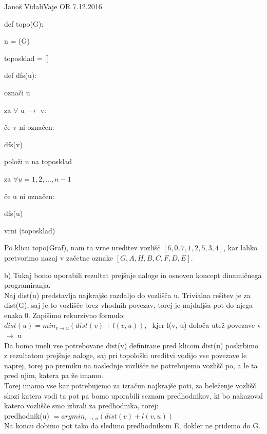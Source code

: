 \begin{naloga}{Janoš Vidali}{Vaje OR 7.12.2016}
\begin{odgovor}
\begin{algorithmic}
\item def topo(G):
\item\quad n = \length(G)
\item\quad toposklad = []  \\
\item\quad def dfs(u): 
\item\qquad označi u
\item\qquad za $\forall$ u $\rightarrow$ v:
\item\qquad\quad če v ni označen: 
\item\qquad\qquad dfs(v) 
\item\qquad\quad položi u na toposklad \\
\item\quad za $\forall u = 1, 2, \dots, n - 1$
\item\qquad če u ni označen:
\item\qquad\quad dfs(u) 
\item\quad vrni \reverse(toposklad) \\
\end{algorithmic}

\noindent Po klicu topo(Graf), nam ta vrne ureditev vozlišč $[6, 0, 7, 1, 2, 5, 3, 4]$, 
kar lahko pretvorimo nazaj v začetne oznake $[G, A, H, B, C, F, D, E]$. \pagebreak

\noindent b) Tukaj bomo uporabili rezultat prejšnje naloge in osnoven 
koncept dinamičnega programiranja.\\

\noindent Naj dist(u) predstavlja najkrajšo razdaljo do vozlišča u.
Trivialna rešitev je za dist(G), saj je to vozlišče brez vhodnih povezav, torej je najdaljša pot do njega
enaka 0. Zapišimo rekurzivno formulo: \\
$dist(u) = min_{v \rightarrow u}(dist(v) + l(v, u))$, \
kjer l(v, u) določa utež povezave v $\rightarrow$ u \\

\noindent Da bomo imeli vse potrebovane dist(v) definirane pred klicom dist(u) 
poskrbimo z rezultatom prejšnje naloge, saj pri topološki ureditvi vodijo vse povezave le naprej, 
torej po premiku na naslednje vozlišče ne potrebujemo vozlišč po, a le ta pred njim,
katera pa že imamo.\\

\noindent Torej imamo vse kar potrebujemo za izračun najkrajše poti, 
za beleženje vozlišč skozi katera vodi ta pot pa bomo uporabili seznam predhodnikov, 
ki bo nakazoval katero vozlišče smo izbrali za predhodnika, torej: \\
predhodnik(u) $= argmin_{v \rightarrow u}(dist(v) + l(v, u))$ \\
Na koncu dobimo pot tako da sledimo predhodnikom E, dokler ne pridemo do G.  \\


\end{odgovor}
\end{naloga}
